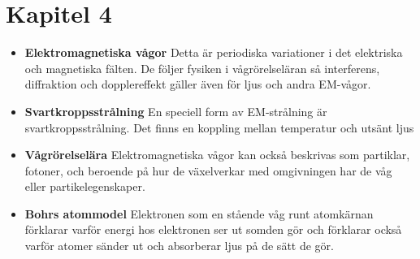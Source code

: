 \documentclass[11pt]{article}
\begin{document}
\section{Kapitel 4}
\begin{itemize}
    \item{\textbf{Elektromagnetiska vågor} Detta är periodiska variationer i det elektriska och magnetiska fälten. De följer fysiken i vågrörelseläran så interferens, diffraktion och dopplereffekt gäller även för ljus och andra EM-vågor.}

    \item{\textbf{Svartkroppsstrålning} En speciell form av EM-strålning är svartkroppsstrålning. Det finns en koppling mellan temperatur och utsänt ljus}

    \item{\textbf{Vågrörelselära} Elektromagnetiska vågor kan också beskrivas som partiklar, fotoner, och beroende på hur de växelverkar med omgivningen har de våg eller partikelegenskaper.}

    \item{\textbf{Bohrs atommodel} Elektronen som en stående våg runt atomkärnan förklarar varför energi hos elektronen ser ut somden gör och förklarar också varför atomer sänder ut och absorberar ljus på de sätt de gör.}
\end{itemize}
\end{document}
